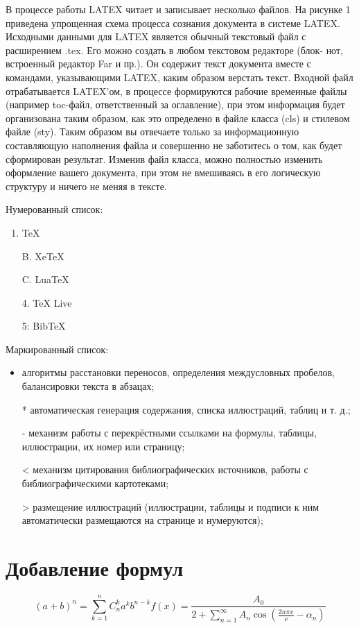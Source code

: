 \documentclass{report} %
\begin{document}
В процессе работы LATEX читает и записывает несколько файлов. На рисунке 1 приведена упрощенная схема процесса сознания документа в системе LATEX. Исходными данными для LATEX является обычный текстовый файл с расширением .tex. Его можно создать в любом текстовом редакторе (блок- нот, встроенный редактор Far и пр.). Он содержит текст документа вместе с командами, указывающими LATEX, каким образом верстать текст. 
Входной файл отрабатывается LATEX’ом, в процессе формируются рабочие временные файлы (например toc-файл, ответственный за оглавление), при этом информация будет организована таким образом, как это определено в файле класса (cls) и стилевом файле (sty). Таким образом вы отвечаете только за информационную составляющую наполнения файла и совершенно не заботитесь о том, как будет сформирован результат. Изменив файл класса, можно полностью изменить оформление вашего документа, при этом не вмешиваясь в его логическую структуру и ничего не меняя в тексте. 


Нумерованный список:
\begin{enumerate} %
    \item TeX 
    \item[B.] XeTeX 
    \item[C.] LuaTeX
    \item[4.] TeX Live
    \item[5:]  BibTeX   
\end{enumerate} 

Маркированный список:
\begin{itemize}%
	\item алгоритмы расстановки переносов, определения междусловных пробелов, балансировки текста в абзацах;
    \item[*] автоматическая генерация содержания, списка иллюстраций, таблиц и т. д.;
    \item[-] механизм работы с перекрёстными ссылками на формулы, таблицы, иллюстрации, их номер или страницу;
    \item[<] механизм цитирования библиографических источников, работы с библиографическими картотеками;
    \item[>] размещение иллюстраций (иллюстрации, таблицы и подписи к ним автоматически размещаются на странице и нумеруются);
\end{itemize}

\section{Добавление формул}
\begin{equation}\label{eq_1} %
    (a+b)^n=\sum_{k=1}^n C^k_n a^kb^{n-k}
    
	f(x) = \frac{A_0}{{2} + \sum \limits_{n=1}^{\infty} A_n \cos \left( \frac{2 n \pi x}{\nu} - \alpha_n \right)}
\end{equation}
\end{document}
